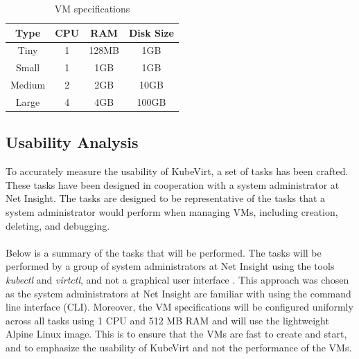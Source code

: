 \documentclass{article}
\begin{document}
\begin{table}[!ht]
    \centering
    \begin{tabular}{ |c|c|c|c| } 
        \hline
        Type & CPU & RAM & Disk Size\\ 
        \hline
        Tiny & 1 & 128MB & 1GB \\
        Small & 1 & 1GB & 1GB \\
        Medium & 2 & 2GB & 10GB \\
        Large & 4 & 4GB & 100GB \\
        \hline
    \end{tabular}
    \caption{VM specifications}
\end{table}


\newpage
\subsection{Usability Analysis}
To accurately measure the usability of KubeVirt, a set of tasks has been crafted. These tasks have been designed in cooperation with a system administrator at Net Insight. The tasks are designed to be representative of the tasks that a system administrator would perform when managing VMs, including creation, deleting, and debugging. 
\\~\\
Below is a summary of the tasks that will be performed. The tasks will be performed by a group of system administrators at Net Insight using the tools \textit{kubectl} and \textit{virtctl}, and not a graphical user interface \cite{kubevirt-docs-virtctl}. This approach was chosen as the system administrators at Net Insight are familiar with using the command line interface (CLI). Moreover, the VM specifications will be configured uniformly across all tasks using 1 CPU and 512 MB RAM and will use the lightweight Alpine Linux image. This is to ensure that the VMs are fast to create and start, and to emphasize the usability of KubeVirt and not the performance of the VMs. 
\end{document}
